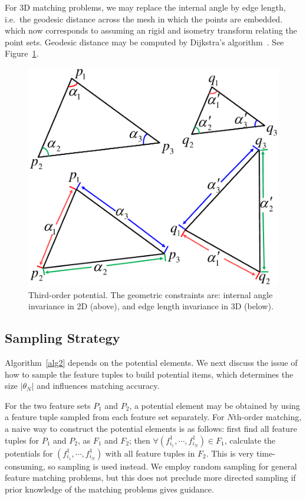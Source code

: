 For 3D matching problems, we may replace the internal angle by edge length, i.e.\ the geodesic distance across the mesh in which the points are embedded. 
which now corresponds to assuming an rigid and isometry transform relating the point sets.
Geodesic distance may be computed by Dijkstra's algorithm~\cite{Peyre2010}.
See  Figure~\ref{fig:TO}.

\begin{figure}
\centering
  \includegraphics[width=0.65\linewidth]{figures/diagram.pdf}
  \caption{Third-order potential. The geometric constraints are: internal angle invariance in 2D (above), and edge length invariance in 3D (below).}
\label{fig:TO}
\end{figure}

\subsection{Sampling Strategy}
\label{subsec:sampling}

Algorithm~\ref{alg2} depends on the potential elements.
We next discuss the issue of how to sample the feature tuples to build potential items, which determines the size $|\theta_N|$ and influences matching accuracy.

For the two feature sets $P_1$ and $P_2$,
a potential element may be obtained by using a feature tuple sampled from each feature set separately.
For $N$th-order matching, a naive way to construct the potential elements is as follows:
first find all feature tuples for $P_1$ and $P_2$, as $F_1$ and $F_2$; then $\forall (f_{i_1}^1, \cdots, f_{i_N}^1)\in F_1$,
calculate the potentials for $(f_{i_1}^1, \cdots, f_{i_N}^1)$ with all feature tuples in $F_2$.
This is very time-consuming, so sampling is used instead.
We employ random sampling for general feature matching problems,
but this does not preclude more directed sampling if prior knowledge of the matching problems gives guidance.

